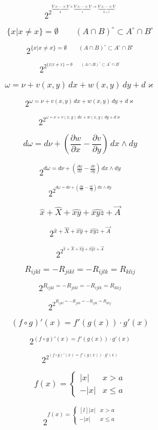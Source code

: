 \documentclass[a4paper,10pt]{article}
\begin{document}
\[
2^{2^{\underbrace{V\times\cdots\times V}_k\times\underbrace{V\times\cdots\times
V}_l \to \underbrace{V\times\cdots\times V}_{k+l}}}
\]

\[
\{x|x\ne x\}=\emptyset\qquad(A\cap B)^\circ\subset A^\circ\cap
B^\circ
\]

\[
2^{\{x|x\ne x\}=\emptyset\qquad(A\cap B)^\circ\subset A^\circ\cap
B^\circ}
\]

\[
2^{2^{\{x|x\ne x\}=\emptyset\qquad(A\cap B)^\circ\subset A^\circ\cap
B^\circ}}
\]

\[
\omega=\nu+v(x,y)\,dx +w(x,y)\,dy +d\varkappa
\]

\[
2^{\omega=\nu+v(x,y)\,dx +w(x,y)\,dy +d\varkappa}
\]

\[
2^{2^{\omega=\nu+v(x,y)\,dx +w(x,y)\,dy +d\varkappa}}
\]

\[
d\omega=d\nu+\left(\frac{\partial w}{\partial x}-\frac{\partial v}{\partial y}\right)\,dx\wedge dy
\]

\[
2^{d\omega=d\nu+\left(\frac{\partial w}{\partial x}-\frac{\partial v}{\partial y}\right)\,dx\wedge dy}
\]

\[
2^{2^{d\omega=d\nu+\left(\frac{\partial w}{\partial x}-\frac{\partial v}{\partial y}\right)\,dx\wedge dy}}
\]

\[
\hat x+\widehat X+\widehat{xy}+\widehat{xyz}+\vec A
\]

\[
2^{\hat x+\widehat X+\widehat{xy}+\widehat{xyz}+\vec A}
\]

\[
2^{2^{\hat x+\widehat X+\widehat{xy}+\widehat{xyz}+\vec A}}
\]

\[
R_{ijkl}=-R_{jikl}=-R_{ijlk}=R_{klij}
\]

\[
2^{R_{ijkl}=-R_{jikl}=-R_{ijlk}=R_{klij}}
\]

\[
2^{2^{R_{ijkl}=-R_{jikl}=-R_{ijlk}=R_{klij}}}
\]

\[
(f\circ g)'(x)=f'(g(x))\cdot g'(x)
\]

\[
2^{(f\circ g)'(x)=f'(g(x))\cdot g'(x)}
\]

\[
2^{2^{(f\circ g)'(x)=f'(g(x))\cdot g'(x)}}
\]

\[
f(x)=\begin{cases}
  |x|  & x>a \\
  -|x| & x\le a
\end{cases}
\]

\[
2^{f(x)=\left\{
\begin{smallmatrix*}[l]
  |x|  & x>a \\
  -|x| & x\le a
\end{smallmatrix*}\right.}
\]
\end{document}

